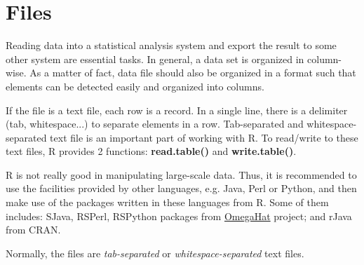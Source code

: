 
\chapter{Files}
\label{chap:files}

Reading data into a statistical analysis system and export the result
to some other system are essential tasks.  In general, a data set is
organized in column-wise. As a matter of fact, data file should also
be organized in a format such that elements can be detected easily and
organized into columns.

If the file is a text file, each row is a record. In a single line,
there is a delimiter (tab, whitespace...)  to separate elements in a
row. Tab-separated and whitespace-separated text file is an important
part of working with R. To read/write to these text files, R provides
2 functions: {\bf read.table()} and {\bf write.table()}.

R is not really good in manipulating large-scale data. Thus, it is
recommended to use the facilities provided by other languages,
e.g. Java, Perl or Python, and then make use of the packages written
in these languages from R. Some of them includes: SJava, RSPerl,
RSPython packages from \href{http://www.omegahat.org}{OmegaHat}
project; and rJava from CRAN.


Normally, the files are {\it tab-separated} or {\it
  whitespace-separated} text files.  

